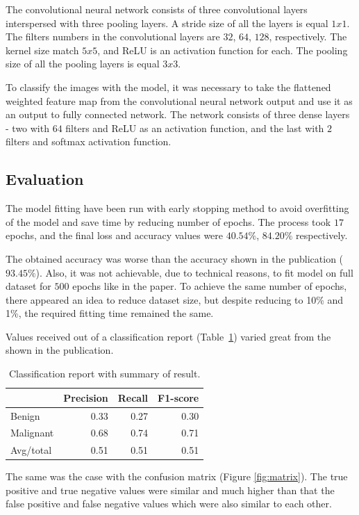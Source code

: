 \documentclass[12pt]{article}
\begin{document}
The convolutional neural network consists of three convolutional layers interspersed with three pooling layers. A stride size of all the layers is equal $1 x 1$. The filters numbers in the convolutional layers are $32$, $64$, $128$, respectively. The kernel size match $5 x 5$, and ReLU is an activation function for each. The pooling size of all the pooling layers is equal $3 x 3$.

To classify the images with the model, it was necessary to take the flattened weighted feature map from the convolutional neural network output and use it as an output to fully connected network. The network consists of three dense layers - two with $64$ filters and ReLU as an activation function, and the last with $2$ filters and softmax activation function.


\subsection{Evaluation}
The model fitting have been run with early stopping method to avoid overfitting of the model and save time by reducing number of epochs. The process took $17$ epochs, and the final loss and accuracy values were $40.54\%$, $84.20\%$ respectively. 

The obtained accuracy was worse than the accuracy shown in the publication ($93.45\%$)\cite{1}. Also, it was not achievable, due to technical reasons, to fit model on full dataset for $500$ epochs like in the paper. To achieve the same number of epochs, there appeared an idea to reduce dataset size, but despite reducing to 10\% and 1\%, the required fitting time remained the same.

Values received out of a classification report (Table~\ref{tab:report}) varied great from the shown in the publication\cite{1}. 

\begin{table}[!ht]
\centering
\begin{tabular}{l|r r r}
 & Precision & Recall & F1-score \\
\hline
Benign & 0.33 & 0.27 & 0.30 \\
Malignant & 0.68 & 0.74 & 0.71 \\
Avg/total & 0.51 & 0.51 & 0.51 \\
\end{tabular}
\caption{\label{tab:report}Classification report with summary of result.}
\end{table}

The same was the case with the confusion matrix (Figure \ref{fig:matrix}). The true positive and true negative values were similar and much higher than that the false positive and false negative values which were also similar to each other.
\clearpage
\end{document}
